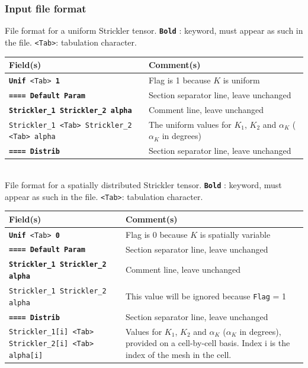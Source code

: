 \subsubsection{Input file format}
%
File format for a uniform Strickler tensor.  \texttt{\textbf{Bold}} : keyword, must appear as such in the file. \texttt{<Tab>}: tabulation character. \\
    \begin{tabular}{p{6cm} | p{9cm}}
    \hline
    Field(s) & Comment(s) \\
    \hline  \hline
    \texttt{\textbf{Unif} <Tab> \textbf{1}} & Flag is 1 because $K$ is uniform \\ \hline
    \texttt{\textbf{==== Default Param}} & Section separator line, leave unchanged \\  \hline
    \texttt{\textbf{Strickler\_1 Strickler\_2 alpha}} & Comment line, leave unchanged \\  \hline
    \texttt{Strickler\_1 <Tab> Strickler\_2 <Tab> alpha} & The uniform values for $K_1$, $K_2$ and $\alpha_K$ ($\alpha_K$ in degrees) \\ \hline
    \texttt{\textbf{==== Distrib}} & Section separator line, leave unchanged \\  \hline
    \end{tabular}
%
\vspace{10mm} \\
%
File format for a spatially distributed Strickler tensor.  \texttt{\textbf{Bold}} : keyword, must appear as such in the file. \texttt{<Tab>}: tabulation character. \\
    \begin{tabular}{p{6cm} | p{9cm}}
    \hline
    Field(s) & Comment(s) \\
    \hline  \hline
    \texttt{\textbf{Unif} <Tab> \textbf{0}} & Flag is 0 because $K$ is spatially variable \\ \hline
    \texttt{\textbf{==== Default Param}} & Section separator line, leave unchanged \\  \hline
    \texttt{\textbf{Strickler\_1 Strickler\_2 alpha}} & Comment line, leave unchanged \\  \hline
    \texttt{Strickler\_1 Strickler\_2 alpha}     & This value will be ignored because \texttt{Flag} = 1 \\ \hline
    \texttt{\textbf{==== Distrib}} & Section separator line, leave unchanged \\  \hline
    \texttt{Strickler\_1[i] <Tab> Strickler\_2[i] <Tab> alpha[i]}      & Values for $K_1$, $K_2$ and $\alpha_K$ ($\alpha_K$ in degrees), provided on a cell-by-cell basis. Index i is the index of the mesh in the cell.  \\ \hline
    \end{tabular}
%
